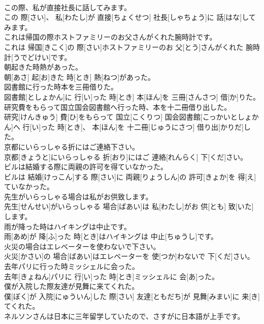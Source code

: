 \documentclass[8pt]{extreport}
\begin{document}
\begin{CJK}{UTF8}{min}
\\	この際、私が直接社長に話してみます。	
\\	この 際[さい]、 私[わたし]が 直接[ちょくせつ] 社長[しゃちょう]に 話[はな]してみます。
\\	これは帰国の際ホストファミリーのお父さんがくれた腕時計です。	
\\	これは 帰国[きこく]の 際[さい]ホストファミリーのお 父[とう]さんがくれた 腕時計[うでどけい]です。
\\	朝起きた時熱があった。	
\\	朝[あさ] 起[お]きた 時[とき] 熱[ねつ]があった。
\\	図書館に行った時本を三冊借りた。	
\\	図書館[としょかん]に 行[い]った 時[とき] 本[ほん]を 三冊[さんさつ] 借[か]りた。
\\	研究費をもらって国立国会図書館へ行った時、本を十二冊借り出した。	
\\	研究[けんきゅう] 費[ひ]をもらって 国立[こくりつ] 国会図書館[こっかいとしょかん]へ 行[い]った 時[とき]、 本[ほん]を 十二冊[じゅうにさつ] 借り出[かりだ]した。
\\	京都にいらっしゃる折にはご連絡下さい。	
\\	京都[きょうと]にいらっしゃる 折[おり]にはご 連絡[れんらく] 下[くだ]さい。
\\	ビルは結婚する際に両親の許可を得ていなかった。	
\\	ビルは 結婚[けっこん]する 際[さい]に 両親[りょうしん]の 許可[きょか]を 得[え]ていなかった。
\\	先生がいらっしゃる場合は私がお供致します。	
\\	先生[せんせい]がいらっしゃる 場合[ばあい]は 私[わたし]がお 供[とも] 致[いた]します。
\\	雨が降った時はハイキングは中止です。	
\\	雨[あめ]が 降[ふ]った 時[とき]はハイキングは 中止[ちゅうし]です。
\\	火災の場合はエレベーターを使わないで下さい。	
\\	火災[かさい]の 場合[ばあい]はエレベーターを 使[つか]わないで 下[くだ]さい。
\\	去年パリに行った時ミッシェルに会った。	
\\	去年[きょねん]パリに 行[い]った 時[とき]ミッシェルに 会[あ]った。
\\	僕が入院した際友達が見舞に来てくれた。	
\\	僕[ぼく]が 入院[にゅういん]した 際[さい] 友達[ともだち]が 見舞[みまい]に 来[き]てくれた。
\\	ネルソンさんは日本に三年留学していたので、さすがに日本語が上手です。	

\end{CJK}
\end{document}
